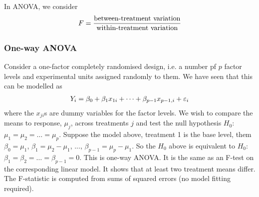 In ANOVA, we consider
\begin{align}
	F = \frac{\text{between-treatment variation}}{\text{within-treatment variation}} \notag
\end{align}

\subsubsection{One-way ANOVA}

Consider a one-factor completely randomised design, i.e. a number pf $p$ factor levels and experimental units assigned randomly to them. We have seen that this can be modelled as
\begin{align}
	Y_i = \beta_0 + \beta_1x_{1i} + \dots + \beta_{p-1}x_{p-1,i} + \epsilon_i \notag
\end{align}
where the $x_{ji}$s are dummy variables for the factor levels. We wish to compare the means to response, $\mu_j$, across treatments $j$ and test the null hypothesis $H_0$: $\mu_1 = \mu_2 = \dots = \mu_p$. Suppose the model above, treatment 1 is the base level, them $\beta_0 = \mu_1$, $\beta_1 = \mu_2 - \mu_1$, ..., $\beta_{p-1} = \mu_p - \mu_1$. So the $H_0$ above is equivalent to $H_0$: $\beta_1 = \beta_2 = \dots = \beta_{p-1} = 0$. This is one-way ANOVA. It is the same as an F-test on the corresponding linear model. It shows that at least two treatment means differ. The F-statistic is computed from sums of squared errors (no model fitting required).

